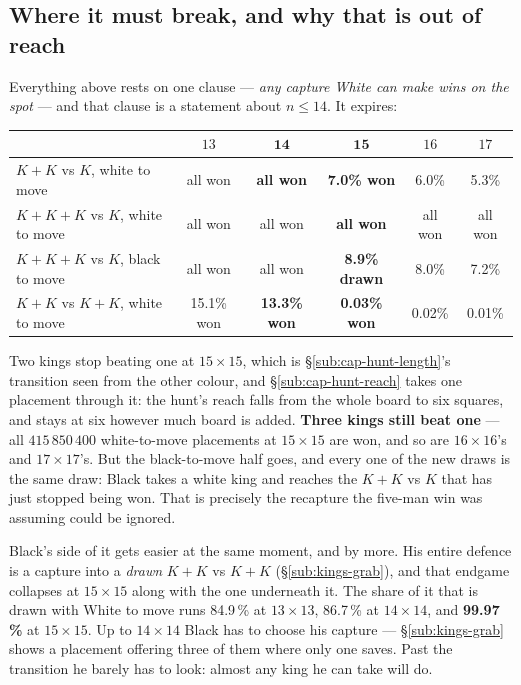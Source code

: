 \documentclass[11pt]{article}
\begin{document}
\subsection{Where it must break, and why that is out of reach}\label{sub:kings-break}

\noindent
Everything above rests on one clause --- \emph{any capture White can make wins
on the spot} --- and that clause is a statement about $n \le 14$. It expires:

\begin{center}\small
\begin{tabular}{lccccc}
\toprule
 & $13$ & $\mathbf{14}$ & $\mathbf{15}$ & $16$ & $17$\\
\midrule
$K\!+\!K$ vs $K$, white to move        & all won & \textbf{all won} & \textbf{7.0\% won} & 6.0\% & 5.3\%\\
$K\!+\!K\!+\!K$ vs $K$, white to move  & all won & all won & \textbf{all won} & all won & all won\\
$K\!+\!K\!+\!K$ vs $K$, black to move  & all won & all won & \textbf{8.9\% drawn} & 8.0\% & 7.2\%\\
$K\!+\!K$ vs $K\!+\!K$, white to move   & 15.1\% won & \textbf{13.3\% won} & \textbf{0.03\% won} & 0.02\% & 0.01\%\\
\bottomrule
\end{tabular}
\end{center}

\noindent
Two kings stop beating one at $15\times15$, which is \S\ref{sub:cap-hunt-length}'s
transition seen from the other colour, and \S\ref{sub:cap-hunt-reach} takes one
placement through it: the hunt's reach falls from the whole board to six
squares, and stays at six however much board is added. \textbf{Three kings still beat one} ---
all $415\,850\,400$ white-to-move placements at $15\times15$ are won, and so are
$16\times16$'s and $17\times17$'s. But the black-to-move half goes, and every one
of the new draws is the same draw: Black takes a white king and reaches the
$K\!+\!K$ vs $K$ that has just stopped being won. That is precisely the
recapture the five-man win was assuming could be ignored.

Black's side of it gets easier at the same moment, and by more. His entire
defence is a capture into a \emph{drawn} $K\!+\!K$ vs $K\!+\!K$
(\S\ref{sub:kings-grab}), and that endgame collapses at $15\times15$ along with
the one underneath it. The share of it that is drawn with White to move runs
84.9\,\% at $13\times13$, 86.7\,\% at $14\times14$, and \textbf{99.97\,\%} at
$15\times15$. Up to $14\times14$ Black has to choose his capture ---
\S\ref{sub:kings-grab} shows a placement offering three of them where only one
saves. Past the transition he barely has to look: almost any king he can take
will do.
\end{document}
